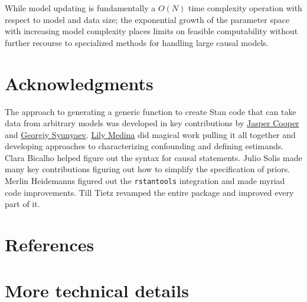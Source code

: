 \documentclass[
  11pt,
  article]{jss}
\begin{document}
While model updating is fundamentally a \(O(N)\) time complexity
operation with respect to model and data size; the exponential growth of
the parameter space with increasing model complexity places limits on
feasible computability without further recourse to specialized methods
for handling large causal models.

\hypertarget{acknowledgments}{%
\section*{Acknowledgments}\label{acknowledgments}}

\begin{tcolorbox}[enhanced jigsaw, opacityback=0, breakable, colback=white, bottomrule=.15mm, toprule=.15mm, arc=.35mm, rightrule=.15mm, leftrule=.75mm, left=2mm]

The approach to generating a generic function to create Stan code that
can take data from arbitrary models was developed in key contributions
by \href{http://jasper-cooper.com/}{Jasper Cooper} and
\href{http://gsyunyaev.com/}{Georgiy Syunyaev}.
\href{https://lilymedina.github.io/}{Lily Medina} did magical work
pulling it all together and developing approaches to characterizing
confounding and defining estimands. Clara Bicalho helped figure out the
syntax for causal statements. Julio Solis made many key contributions
figuring out how to simplify the specification of priors. Merlin
Heidemanns figured out the \texttt{rstantools} integration and made
myriad code improvements. Till Tietz revamped the entire package and
improved every part of it.

\end{tcolorbox}

\hypertarget{references}{%
\section*{References}\label{references}}

\renewcommand{\bibsection}{}


\newpage{}

\hypertarget{sec-techdetails}{%
\section*{More technical details}\label{sec-techdetails}}
\end{document}
